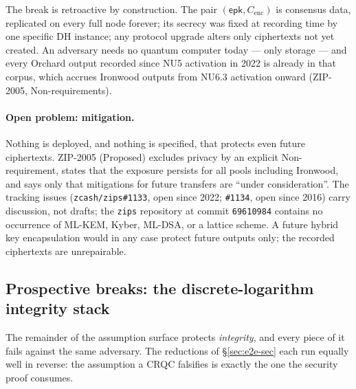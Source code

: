 \documentclass[11pt,a4paper]{article}
\theoremstyle{definition}
\begin{document}
The break is retroactive by construction. The pair
$(\mathsf{epk}, C_{\mathrm{enc}})$ is consensus data, replicated on every full
node forever; its secrecy was fixed at recording time by one specific DH
instance; any protocol upgrade alters only ciphertexts not yet created. An
adversary needs no quantum computer today --- only storage --- and every
Orchard output recorded since NU5 activation in 2022 is already in that
corpus, which accrues Ironwood outputs from NU6.3 activation onward
(ZIP-2005, Non-requirements).

\paragraph{Open problem: mitigation.} Nothing is deployed, and nothing is
specified, that protects even future ciphertexts. ZIP-2005 (Proposed) excludes
privacy by an explicit Non-requirement, states that the exposure persists for
all pools including Ironwood, and says only that mitigations for future
transfers are ``under consideration''. The tracking issues
(\texttt{zcash/zips\#1133}, open since 2022; \texttt{\#1134}, open since 2016)
carry discussion, not drafts; the \texttt{zips} repository at commit
\texttt{69610984} contains no occurrence of ML-KEM, Kyber, ML-DSA, or a
lattice scheme. A future hybrid key encapsulation would in any case protect
future outputs only; the recorded ciphertexts are unrepairable.

\subsection{Prospective breaks: the discrete-logarithm integrity
stack}\label{sec:pq-integrity}

The remainder of the assumption surface protects \emph{integrity}, and every
piece of it fails against the same adversary. The reductions of
\S\ref{sec:e2e-sec} each run equally well in reverse: the assumption a CRQC
falsifies is exactly the one the security proof consumes.
\end{document}
